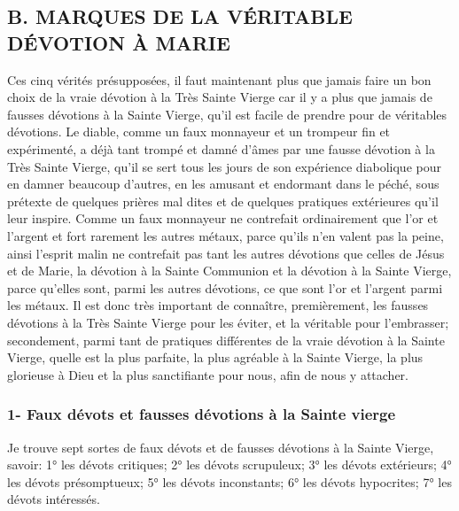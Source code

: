 \subsection{B. MARQUES DE LA VÉRITABLE DÉVOTION À MARIE}
 Ces cinq vérités présupposées, il faut maintenant plus que jamais faire un bon choix de la vraie dévotion à la
Très Sainte Vierge car il y a plus que jamais de fausses dévotions à la Sainte Vierge, qu'il est facile de prendre
pour de véritables dévotions. Le diable, comme un faux monnayeur et un trompeur fin et expérimenté, a déjà tant
trompé et damné d'âmes par une fausse dévotion à la Très Sainte Vierge, qu'il se sert tous les jours de son
expérience diabolique pour en damner beaucoup d'autres, en les amusant et endormant dans le péché, sous
prétexte de quelques prières mal dites et de quelques pratiques extérieures qu'il leur inspire. Comme un faux
monnayeur ne contrefait ordinairement que l'or et l'argent et fort rarement les autres métaux, parce qu'ils n'en
valent pas la peine, ainsi l'esprit malin ne contrefait pas tant les autres dévotions que celles de Jésus et de Marie,
la dévotion à la Sainte Communion et la dévotion à la Sainte Vierge, parce qu'elles sont, parmi les autres
dévotions, ce que sont l'or et l'argent parmi les métaux.
 Il est donc très important de connaître, premièrement, les fausses dévotions à la Très Sainte Vierge pour les
éviter, et la véritable pour l'embrasser; secondement, parmi tant de pratiques différentes de la vraie dévotion à la
Sainte Vierge, quelle est la plus parfaite, la plus agréable à la Sainte Vierge, la plus glorieuse à Dieu et la plus
sanctifiante pour nous, afin de nous y attacher.
\subsubsection{1- Faux dévots et fausses dévotions à la Sainte vierge}
 Je trouve sept sortes de faux dévots et de fausses dévotions à la Sainte Vierge, savoir:
1° les dévots critiques;
2° les dévots scrupuleux;
3° les dévots extérieurs;
4° les dévots présomptueux;
5° les dévots inconstants;
6° les dévots hypocrites;
7° les dévots intéressés.

